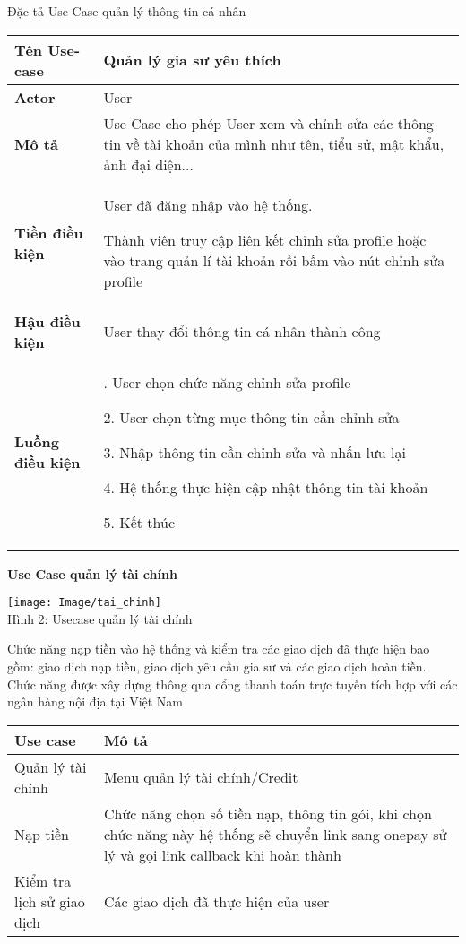 \documentclass[12pt,a4paper]{report}
\begin{document}
Đặc tả Use Case quản lý thông tin cá nhân
\begin{center}
 \begin{tabular}{|>{\raggedright\arraybackslash}m{4cm}|>{\raggedright\arraybackslash}m{11.5cm}|}
 \hline 
 \textbf{Tên Use-case} & Quản lý gia sư yêu thích \\ 
 \hline 
 \textbf{Actor} & User \\ 
 \hline 
\textbf{ Mô tả} & Use Case cho phép User xem và chỉnh sửa các thông tin về tài khoản của mình như tên, tiểu sử, mật khẩu, ảnh đại diện... \\ 
 \hline 
 \textbf{Tiền điều kiện} & User đã đăng nhập vào hệ thống.
 
						   Thành viên truy cập liên kết chỉnh sửa profile hoặc vào
trang quản lí tài khoản rồi bấm vào nút chỉnh sửa profile\\ 
 \hline 
 \textbf{Hậu điều kiện} & User thay đổi thông tin cá nhân thành công \\ 
 \hline 
 \textbf{Luồng điều kiện} & 1. User chọn chức năng chỉnh sửa profile 
 
				   2. User chọn từng mục thông tin cần chỉnh sửa

			       3. Nhập thông tin cần chỉnh sửa và nhấn lưu lại

				   4. Hệ thống thực hiện cập nhật thông tin tài khoản
				   
				   5. Kết thúc\\ 
 \hline  
 \end{tabular} 
 \end{center}
 
 \textbf{Use Case quản lý tài chính}
 \begin{center}
    \begin{center}
     \texttt{[image: Image/tai\_chinh]}\\
     Hình 2: Usecase quản lý tài chính
    \end{center}
\end{center}

Chức năng nạp tiền vào hệ thống và kiểm tra các giao dịch đã thực hiện bao gồm: giao dịch nạp tiền, giao dịch yêu cầu gia sư và các giao dịch hoàn tiền.\\

Chức năng được xây dựng thông qua cổng thanh toán trực tuyến tích hợp với
các ngân hàng nội địa tại Việt Nam

\begin{center}
 \begin{tabular}{|>{\raggedright\arraybackslash}m{4cm}|>{\raggedright\arraybackslash}m{11.5cm}|}
\hline 
\textbf{Use case} & \textbf{Mô tả} \\ 
\hline 
Quản lý tài chính & Menu quản lý tài chính/Credit \\ 
\hline 
Nạp tiền  & Chức năng chọn số tiền nạp, thông tin gói, khi chọn chức năng này hệ thống sẽ chuyển link sang onepay sử lý và gọi link callback khi hoàn thành\\ 
\hline 
Kiểm tra lịch sử giao dịch & Các giao dịch đã thực hiện của user \\ 
\hline 
\end{tabular}
 \end{center} 
 
\end{document}
